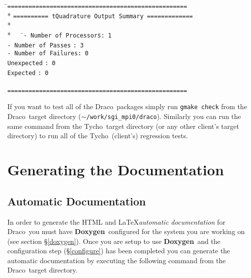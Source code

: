 \documentclass[10pt]{nmemo}
\newcommand{\comp}[1]{\normalfont\normalsize\texttt{#1}}
\newcommand{\draco}{{\normalfont\sffamily Draco}}
\newcommand{\tycho}{{\normalfont\sffamily Tycho}}
\newcommand{\doxygen}{{\normalfont\bfseries Doxygen}}
\begin{document}
\footnotesize
\begin{tabbing}
\hspace{0.5in}\=\comp{===================================================}\\*
\+\>\comp{========== tQuadrature Output Summary =============}\\*
\ \\*
\ \ \ \=\comp{- Number of Processors}\hspace{0.5in}\=\comp{:\ 1}\\
\>\comp{- Number of Passes}\>  \comp{:\ 3}\\
\>\comp{- Number of Failures}\>\comp{:\ 0}\\
\>\hspace{0.95in}\comp{Unexpected}\>          \comp{:\ 0}\\
\>\hspace{0.95in}\comp{Expected}\>            \comp{:\ 0}\\
\ \\
\comp{===================================================}

\end{tabbing}
\normalsize

If you want to test all of the \draco\ packages simply run 
\comp{gmake check} from the \draco\ target directory
(\comp{$\sim$/work/sgi\_mpi0/draco}).  Similarly you can run the same
command from the \tycho\ target directory (or any other client's
target directory) to run all of the \tycho\ (client's)
regression tests.


\section{Generating the Documentation}

\subsection{Automatic Documentation}

In order to generate the HTML and \LaTeX \emph{automatic documentation} for
\draco\ you must have \doxygen\ configured for the system you are
working on (see section \S\ref{doxygen}).  Once you are setup to use
\doxygen\ and the configuration step (\S\ref{configure}) has been
completed you can generate the automatic documentation by executing the
following command from the \draco\ target directory.
\end{document}
